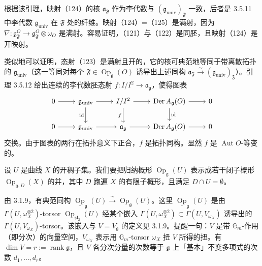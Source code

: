 
根据该引理，映射（124）的核 $\mathfrak{a}_{\mathfrak{F}}$ 作为李代数与 $(\mathfrak{g}_{\mathrm{univ}})_{\mathfrak{F}}$ 一致，后者是 3.5.11 中李代数 $\mathfrak{g}_{\mathrm{univ}}$ 在 $\mathfrak{F}$ 处的纤维。映射（124）=（125）是满射，因为 $\nabla:\mathfrak{g}^{O}_{\mathfrak{F}}\to\mathfrak{g}^{O}_{\mathfrak{F}}\otimes\omega_{O}$ 是满射。容易证明，（121）与（122）是同胚，且映射（124）是开映射。

类似地可以证明，态射（123）是满射且开的，它的核可典范地等同于带离散拓扑的 $\mathfrak{g}_{\mathrm{univ}}$（这一等同对每个 $\mathfrak{F}\in\operatorname{Op}_{\mathfrak{g}}(O)$ 诱导出上述同构 $\mathfrak{a}_{\mathfrak{F}}\xrightarrow{\sim}(\mathfrak{g}_{\mathrm{univ}})_{\mathfrak{F}}$）。引理 3.5.12 给出连续的李代数胚态射 $f:I/I^{2}\to\mathfrak{a}_{\mathfrak{g}}$，使得图表
\[
\begin{tikzcd}
  0 \arrow[r] & \mathfrak{g}_{\mathrm{univ}} \arrow[r] \arrow[d, "\mathrm{id}"'] & I/I^{2} \arrow[r] \arrow[d, "f"']
    & \operatorname{Der}A_{\mathfrak{g}}(O) \arrow[r] \arrow[d, "\mathrm{id}"] & 0 \\
  0 \arrow[r] & \mathfrak{g}_{\mathrm{univ}} \arrow[r] & \mathfrak{a}_{\mathfrak{g}} \arrow[r]
    & \operatorname{Der}A_{\mathfrak{g}}(O) \arrow[r] & 0
\end{tikzcd}
\]
交换。由于图表的两行在拓扑意义下正合，$f$ 是拓扑同构。显然 $f$ 是 $\operatorname{Aut}O$-等变的。


 设 $U$ 是曲线 $X$ 的开稠子集。我们要把归纳概形 $\operatorname{Op}_{\mathfrak{g}}(U)$ 表示成若干闭子概形 $\operatorname{Op}_{\mathfrak{g},D}(X)$ 的并，其中 $D$ 跑遍 $X$ 的有限子概形，且满足 $D\cap U=\emptyset$。

由 3.1.9，有典范同构 $\underline{\operatorname{Op}}_{\mathfrak{g}}(U)\xrightarrow{\sim}\operatorname{Op}_{\mathfrak{g}}(U)$。这里 $\underline{\operatorname{Op}}_{\mathfrak{g}}(U)$ 是由 $\Gamma(U,\omega_{X}^{\otimes 2})$-torsor $\operatorname{Op}_{\mathfrak{sl}_{2}}(U)$ 经某个嵌入 $\Gamma(U,\omega_{X}^{\otimes 2})\subset\Gamma(U,V_{\omega_{X}})$ 诱导出的 $\Gamma(U,V_{\omega_{X}})$-torsor。该嵌入与 $V=V_{\mathfrak{g}}$ 的定义见 3.1.9。提醒一句：$V$ 是带 $\mathbb{G}_{m}$-作用（即分次）的向量空间，$V_{\omega_{X}}$ 表示用 $\mathbb{G}_{m}$-torsor $\omega_{X}$ 扭 $V$ 所得的扭。有 $\dim V=r:=\operatorname{rank}\mathfrak{g}$，且 $V$ 各分次分量的次数等于 $\mathfrak{g}$ 上「基本」不变多项式的次数 $d_{1},\ldots,d_{r}$。

